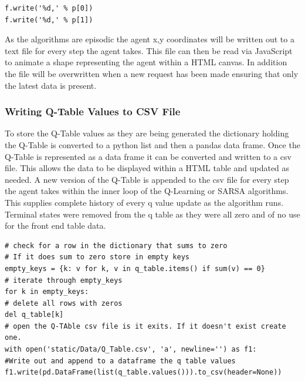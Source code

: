 \begin{verbatim}
f.write('%d,' % p[0])
f.write('%d,' % p[1])
\end{verbatim}
As the algorithms are episodic the agent x,y coordinates will be written out to a text file for every step the agent takes. This file can then be read via JavaScript to animate a shape representing the agent within a HTML canvas.
In addition the file will be overwritten when a new request has been made ensuring that only the latest data is present.
\subsubsection{Writing Q-Table Values to CSV File}
To store the Q-Table values as they are being generated the dictionary holding the Q-Table is converted to a python list and then a pandas data frame. Once the Q-Table is represented as a data frame it can be converted and written to a csv file. This allows the data to be displayed within a HTML table and updated as needed. A new version of the Q-Table is appended to the csv file for every step the agent takes within the inner loop of the Q-Learning or SARSA algorithms. This supplies complete history of every q value update as the algorithm runs. Terminal states were removed from the q table as they were all zero and of no use for the front end table data.

\begin{verbatim}
# check for a row in the dictionary that sums to zero
# If it does sum to zero store in empty keys
empty_keys = {k: v for k, v in q_table.items() if sum(v) == 0}
# iterate through empty_keys
for k in empty_keys:
# delete all rows with zeros
del q_table[k]
# open the Q-TAble csv file is it exits. If it doesn't exist create one.
with open('static/Data/Q_Table.csv', 'a', newline='') as f1:
#Write out and append to a dataframe the q table values
f1.write(pd.DataFrame(list(q_table.values())).to_csv(header=None))
\end{verbatim}
